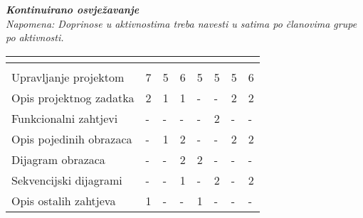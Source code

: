 			\textbf{\textit{Kontinuirano osvježavanje}}\\
			
			 \textit{Napomena: Doprinose u aktivnostima treba navesti u satima po članovima grupe po aktivnosti.}
					
						
			
			\begin{longtabu} to \textwidth {|X[7, l]|X[1, c]|X[1, c]|X[1, c]|X[1, c]|X[1, c]|X[1, c]|X[1, c]|}
								
				  &      &  &	 &	 &
				 &
				 &	 \\ \hline 
				\endfirsthead
				
			
				  &      &  &	 &
				 &	 &
				 &	 \\ \hline 
				\endhead
				
				
				\endfoot
							
				 
				\endlastfoot
				
				Upravljanje projektom 		& 7 & 5 & 6 & 5 & 5 & 5 & 6 \\ \hline
				Opis projektnog zadatka 	& 2 & 1 & 1 & -  & - & 2 & 2 \\ \hline
				
				Funkcionalni zahtjevi       & - & - & - & - & 2 & - & -  \\ \hline
				Opis pojedinih obrazaca 	& - & 1 & 2 & - & - & 2 & 2 \\ \hline
				Dijagram obrazaca 			& - & - & 2 & 2 & - & - & - \\ \hline
				Sekvencijski dijagrami 		& - & - & 1 & - & 2 & - & 2 \\ \hline
				Opis ostalih zahtjeva 		& 1 & - & - & 1 & - & - & - \\ \hline


\end{longtabu}
